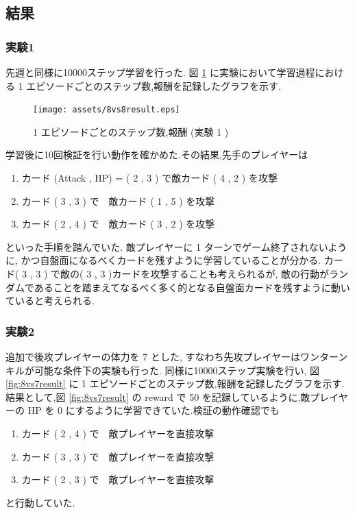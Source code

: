 \documentclass{jarticle}     %
\begin{document}
\subsection{結果}
\subsubsection{実験1}
先週と同様に10000ステップ学習を行った.
図 \ref{fig:8vs8result} に実験において学習過程における 1 エピソードごとのステップ数,報酬を記録したグラフを示す.

\begin{figure}[htbp]
  \centering
  \texttt{[image: assets/8vs8result.eps]}
  \caption{ 1 エピソードごとのステップ数,報酬 (実験 1 )}
  \label{fig:8vs8result}
\end{figure}

学習後に10回検証を行い動作を確かめた.その結果,先手のプレイヤーは
\begin{enumerate}
  \item カード (Attack , HP) = ( 2 , 3 ) で敵カード ( 4 , 2 ) を攻撃
  \item カード ( 3 , 3 ) で　敵カード ( 1 , 5 ) を攻撃
  \item カード ( 2 , 4 ) で　敵カード ( 3 , 2 ) を攻撃
\end{enumerate}
といった手順を踏んでいた.
敵プレイヤーに 1 ターンでゲーム終了されないように, かつ自盤面になるべくカードを残すように学習していることが分かる.
カード( 3 , 3 ) で敵の( 3 , 3 )カードを攻撃することも考えられるが, 敵の行動がランダムであることを踏まえてなるべく多く的となる自盤面カードを残すように動いていると考えられる.
\subsubsection{実験2}
追加で後攻プレイヤーの体力を 7 とした, すなわち先攻プレイヤーはワンターンキルが可能な条件下の実験も行った.
同様に10000ステップ実験を行い, 図 \ref{fig:8vs7result} に 1 エピソードごとのステップ数,報酬を記録したグラフを示す.
結果として,図 \ref{fig:8vs7result} の reward で 50 を記録しているように,敵プレイヤーの HP を 0 にするように学習できていた.検証の動作確認でも
\begin{enumerate}
  \item カード ( 2 , 4 ) で　敵プレイヤーを直接攻撃
  \item カード ( 3 , 3 ) で　敵プレイヤーを直接攻撃
  \item カード ( 2 , 3 ) で　敵プレイヤーを直接攻撃
\end{enumerate}
と行動していた.
\end{document}
